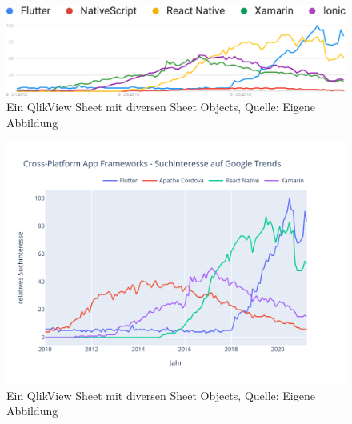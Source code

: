 \documentclass[11pt, twoside]{article}
\begin{document}
 
  

   



 



\setlength{\parskip}{14pt}





\begin{figure}[htbp]
	\centering
    \includegraphics[width=1.0\textwidth]{images/charts/Google Trends/frameworks.pdf}
	\caption[ Weltweit Ein QlikView Sheet mit diversen Sheet Objects]{Ein QlikView Sheet mit diversen Sheet Objects, Quelle: Eigene Abbildung}
	\label{fig:Sheet1}
\end{figure}


\begin{figure}[htbp]
	\centering
    \includegraphics[width=1.0\textwidth]{images/charts/Google Trends/frameworks_plot.pdf}
	\caption[ Weltweit Ein QlikView Sheet mit diversen Sheet Objects]{Ein QlikView Sheet mit diversen Sheet Objects, Quelle: Eigene Abbildung}
	\label{fig:Sheet2}
\end{figure}
\end{document}
